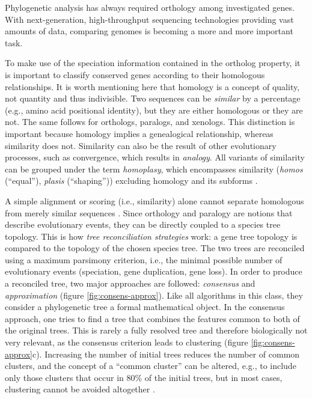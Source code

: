 Phylogenetic analysis has always required orthology among investigated genes.
With next-generation, high-throughput sequencing technologies providing vast
amounts of data, comparing genomes is becoming a more and more important task. 

To make use of the speciation information contained in the ortholog property, it
is important to classify conserved genes according to their homologous
relationships. It is worth mentioning here that homology is a concept of
quality, not quantity \citep{reeck1987} and thus indivisible. Two sequences can
be \emph{similar} by a percentage (e.g., amino acid positional identity), but
they are either homologous or they are not. The same follows for orthologs,
paralogs, and xenologs. This distinction is important because homology implies a
genealogical relationship, whereas similarity does not. Similarity can also be
the result of other evolutionary processes, such as convergence, which results
in \emph{analogy}. All variants of similarity can be grouped under the term
\emph{homoplasy}, which encompasses similarity (\emph{homos} (``equal''),
\emph{plasis} (``shaping'')) excluding homology and its subforms \citep{page1998}.

A simple alignment or scoring (i.e., similarity) alone cannot separate
homologous from merely similar sequences \citep{eisen1998}. Since orthology and
paralogy are notions that describe evolutionary events, they can be directly
coupled to a species tree topology. This is how \emph{tree reconciliation
strategies} work: a gene tree topology is compared to the topology of the chosen
species tree. The two trees are reconciled using a maximum parsimony criterion,
i.e., the minimal possible number of evolutionary events (speciation, gene
duplication, gene loss). In order to produce a reconciled tree, two major
approaches are followed: \emph{consensus} and \emph{approximation} (figure
\ref{fig:consens-approx}). Like all algorithms in this class, they consider a
phylogenetic tree a formal mathematical object. In the consensus approach, one
tries to find a tree that combines the features common to both of the original
trees. This is rarely a fully resolved tree and therefore biologically not very
relevant, as the consensus criterion leads to clustering (figure
\ref{fig:consens-approx}c). Increasing the number of initial trees reduces the
number of common clusters, and the concept of a ``common cluster'' can be
altered, e.g., to include only those clusters that occur in 80\% of the initial
trees, but in most cases, clustering cannot be avoided altogether
\citep{mirkin1995}.

